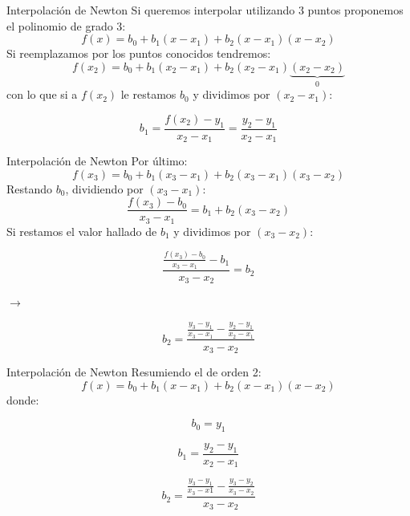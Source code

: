 \documentclass[xcolor=svgnames]{beamer} %
\theoremstyle{plain}
\theoremstyle{definition}
\begin{document}
\begin{frame}{Interpolación de Newton}
  Si queremos interpolar utilizando 3 puntos proponemos el polinomio de grado 3:
  $$ f(x) = b_0 + b_1(x-x_1) + b_2(x-x_1)(x-x_2)  $$ 
  Si reemplazamos por los puntos conocidos tendremos: \pause
  $$ f(x_2) = b_0 + b_1 (x_2-x_1) + b_2(x_2-x_1)\underbrace{(x_2-x_2)}_{0}$$
  con lo que si a $f(x_2)$ le restamos $b_0$ y dividimos por $(x_2-x_1)$:\pause
  
  $$\boxed{b_1  = \frac{f(x_2) -y_1}{x_2-x_1} = \frac{y_2-y_1}{x_2-x_1}}$$

\end{frame}

\begin{frame}{Interpolación de Newton}
  Por último:
  $$f(x_3) = b_0 + b_1(x_3-x_1) + b_2(x_3-x_1)(x_3-x_2) $$
  Restando $b_0$, dividiendo por $(x_3-x_1)$:\pause
  $$\frac{f(x_3) -b_0}{x_3-x_1} = b_1 +b_2(x_3-x_2) $$
  Si restamos el valor hallado de $b_1$ y dividimos por $(x_3-x_2)$:\pause
  
  \begin{minipage}{.45\linewidth}
      $$ \frac{\frac{f(x_3) -b_0}{x_3-x_1} - b_1}{x_3-x_2} = b_2$$
  \end{minipage}\pause$\rightarrow$\begin{minipage}{.45\linewidth}
      $$\boxed{ b_2 = \frac{\frac{y_3-y_1}{x_3-x_1} - \frac{y_2-y_1}{x_2-x_1} }{x_3-x_2} }$$
  \end{minipage}

\end{frame}

\begin{frame}{Interpolación de Newton}
  Resumiendo el de orden 2:
  $$ f(x) = b_0 + b_1(x-x_1) + b_2(x-x_1)(x-x_2)$$
  donde:
  
  \begin{minipage}{.45\linewidth}
    \begin{tcolorbox}
      $$b_0 = y_1$$
    \end{tcolorbox}
  \end{minipage}  \begin{minipage}{.45\linewidth}
    \begin{tcolorbox}
      $$b_1 = \frac{y_2 -y_1}{x_2-x_1}$$
    \end{tcolorbox}
  \end{minipage}
  \begin{center}
    \begin{minipage}{.6\linewidth}
      \begin{tcolorbox}
        $$b_2  = \frac{\frac{y_3-y_1}{x_3-x1} - \frac{y_3-y_2}{x_3-x_2}}{x_3-x_2}$$
      \end{tcolorbox}  
    \end{minipage}
  \end{center}

\end{frame}
\end{document}
